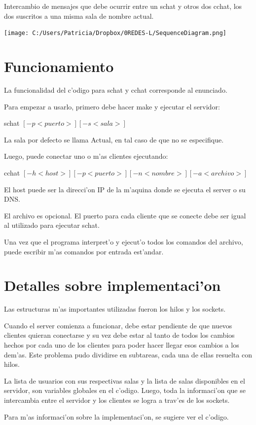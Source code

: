 \documentclass[11pt, spanish]{extarticle}
\begin{document}
Intercambio de mensajes que debe ocurrir entre un schat y
otros dos cchat, los dos suscritos a una misma sala de nombre actual.

\texttt{[image: C:/Users/Patricia/Dropbox/0REDES-L/SequenceDiagram.png]}

\clearpage

\section{Funcionamiento}

La funcionalidad del c'odigo para schat y cchat corresponde al enunciado.

Para empezar a usarlo, primero debe hacer make y ejecutar el servidor:

schat $[-p <puerto>] [-s <sala>] $

La sala por defecto se llama Actual, en tal caso de que no se especifique.

Luego, puede conectar uno o m'as clientes ejecutando:

cchat $[-h <host>] [-p <puerto>] [-n <nombre>][-a <archivo>] $


El host puede ser la direcci'on IP de la m'aquina donde se ejecuta el server o su DNS.

El archivo es opcional. El puerto para cada cliente que se conecte debe ser igual al utilizado para ejecutar schat.

Una vez que el programa interpret'o y ejecut'o todos los comandos del archivo, puede escribir m'as comandos por entrada est'andar.

\clearpage

\section{Detalles sobre implementaci'on}
Las estructuras m'as importantes utilizadas fueron los hilos y los sockets.

Cuando el server comienza a funcionar, debe estar pendiente de que nuevos clientes quieran conectarse y su vez debe estar al tanto de todos los cambios hechos por cada uno de los clientes para poder hacer llegar esos cambios a los dem'as. Este problema pudo dividirse en subtareas, cada una de ellas resuelta con hilos.

La lista de usuarios con sus respectivas salas y la lista de salas disponibles en el servidor, son variables globales en el c'odigo. Luego, toda la informaci'on que se intercambia entre el servidor y los clientes se logra a trav'es de los sockets.

Para m'as informaci'on sobre la implementaci'on, se sugiere ver el c'odigo.

\clearpage
\end{document}

